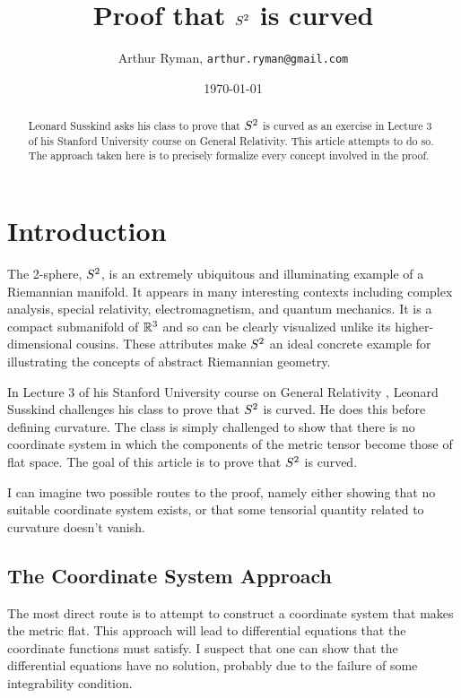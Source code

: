 \documentclass[11pt, oneside]{article}
\title{Proof that $S^2$ is curved}
\author{Arthur Ryman, {\tt arthur.ryman@gmail.com}}
\date{\today}
\begin{document}
\maketitle

\begin{abstract}
Leonard Susskind asks his class to prove that $S^2$ is curved as an exercise in Lecture 3 of his
Stanford University course on General Relativity.
This article attempts to do so.
The approach taken here is to precisely formalize every concept involved in the proof.
\end{abstract}

\section{Introduction}

The 2-sphere, $S^2$, is an extremely ubiquitous and illuminating example of a Riemannian manifold.
It appears in many interesting contexts including complex analysis, special relativity, electromagnetism, and quantum mechanics.
It is a compact submanifold of $\mathbb{R}^3$ and so can be clearly visualized unlike its higher-dimensional cousins.
These attributes make $S^2$ an ideal concrete example for illustrating the concepts of 
abstract Riemannian geometry.

In Lecture 3 of his Stanford University course on General Relativity \cite{susskind-gr3},
Leonard Susskind challenges his class to prove that $S^2$ is curved.
He does this before defining curvature.
The class is simply challenged to show that there is no coordinate system in which the components
of the metric tensor become those of flat space.
The goal of this article is to prove that $S^2$ is curved.

I can imagine two possible routes to the proof, namely either showing that no suitable coordinate system exists, 
or that some tensorial quantity related to curvature doesn't vanish.

\subsection{The Coordinate System Approach}
 
The most direct route is to attempt to construct a coordinate system that makes the metric flat.
This approach will lead to differential equations that the coordinate functions must satisfy.
I suspect that one can show that the differential equations have no solution, probably due to the failure of some
integrability condition.
\end{document}
